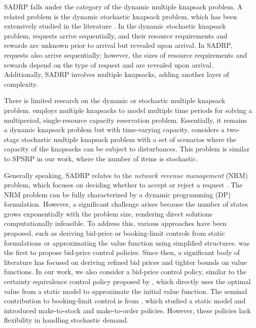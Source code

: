 SADRP falls under the category of the dynamic multiple knapsack problem. A related problem is the dynamic stochastic knapsack problem, which has been extensively studied in the literature \citep{kleywegt1998dynamic, kleywegt2001dynamic, papastavrou1996dynamic}. In the dynamic stochastic knapsack problem, requests arrive sequentially, and their resource requirements and rewards are unknown prior to arrival but revealed upon arrival. In SADRP, requests also arrive sequentially; however, the sizes of resource requirements and rewards depend on the type of request and are revealed upon arrival. Additionally, SADRP involves multiple knapsacks, adding another layer of complexity.


There is limited research on the dynamic or stochastic multiple knapsack problem. \citep{perry2009approximate} employs multiple knapsacks to model multiple time periods for solving a multiperiod, single-resource capacity reservation problem. Essentially, it remains a dynamic knapsack problem but with time-varying capacity. \citep{tonissen2017column} considers a two-stage stochastic multiple knapsack problem with a set of scenarios where the capacity of the knapsacks can be subject to disturbances. This problem is similar to SPSRP in our work, where the number of items is stochastic.


Generally speaking, SADRP relates to the \textit{network revenue management} (NRM) problem, which focuses on deciding whether to accept or reject a request \citep{gallego1997multiproduct}. The NRM problem can be fully characterized by a dynamic programming (DP) formulation. However, a significant challenge arises because the number of states grows exponentially with the problem size, rendering direct solutions computationally infeasible. To address this, various approaches have been proposed, such as deriving bid-price or booking-limit controls from static formulations or approximating the value function using simplified structures. \citet{talluri1998analysis} was the first to propose bid-price control policies. Since then, a significant body of literature has focused on deriving refined bid prices and tighter bounds on value functions. In our work, we also consider a bid-price control policy, similar to the certainty equivalence control policy proposed by \citet{bertsimas2003revenue}, which directly uses the optimal value from a static model to approximate the initial value function. The seminal contribution to booking-limit control is from \citet{gallego1997multiproduct}, which studied a static model and introduced make-to-stock and make-to-order policies. However, these policies lack flexibility in handling stochastic demand.


